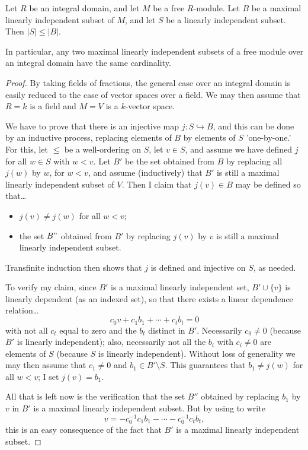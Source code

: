 \begin{proposition}
Let $R$ be an integral domain, and let $M$ be a free $R$-module. Let $B$ be a maximal linearly independent subset of $M$,
and let $S$ be a linearly independent subset. Then $|S| \leq |B|$.

In particular, any two maximal linearly independent subsets of a free module over an integral domain have the same cardinality.
\end{proposition}

\begin{proof}
By taking fields of fractions, the general case over an integral domain is easily reduced to the case of vector spaces over
a field. We may then assume that $R = k$ is a field and $M = V$ is a $k$-vector space.

We have to prove that there is an injective map $j : S \hookrightarrow B$, and this can be done by an inductive process, replacing
elements of $B$ by elements of $S$ 'one-by-one.' For this, let $\leq$ be a well-ordering on $S$, let $v \in S$, and assume we have
defined $j$ for all $w \in S$ with $w < v$. Let $B'$ be the set obtained from $B$ by replacing all $j(w)$ by $w$, for $w < v$, and
assume (inductively) that $B'$ is still a maximal linearly independent subset of $V$. Then I claim that $j(v) \in B$ may be defined
so that\dots
\begin{itemize}
  \item $j(v) \neq j(w)$ for all $w < v$;
  \item the set $B"$ obtained from $B'$ by replacing $j(v)$ by $v$ is still a maximal linearly independent subset.
\end{itemize}
Transfinite induction then shows that $j$ is defined and injective on $S$, as needed.

To verify my claim, since $B'$ is a maximal linearly independent set, $B' \cup \{ v \}$ is linearly dependent (as an indexed set), so
that there exists a linear dependence relation\dots
$$c_0v+c_1b_1 + \cdots + c_tb_t = 0$$
with not all $c_t$ equal to zero and the $b_t$ distinct in $B'$. Necessarily $c_0 \neq 0$ (because $B'$ is linearly independent); also,
necessarily not all the $b_i$ with $c_i \neq 0$ are elements of $S$ (because $S$ is linearly independent). Without loss of generality we
may then assume that $c_1 \neq 0$ and $b_1 \in B' \setminus S$. This guarantees that $b_1 \neq j(w)$ for all $w < v$; I set $j(v) = b_1$.

All that is left now is the verification that the set $B''$ obtained by replacing $b_1$ by $v$ in $B'$ is a maximal linearly independent subset.
But by using to write
$$v =-c_0^{-1}c_1b_1 - \cdots - c_0^{-1}c_tb_t,$$
this is an easy consequence of the fact that $B'$ is a maximal linearly independent subset.
\end{proof}

